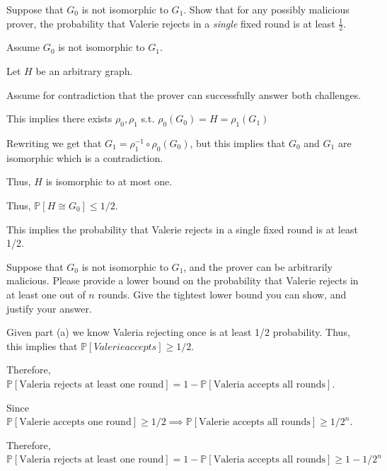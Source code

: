 \documentclass[12pt, letterpaper]{article}
\renewcommand{\P}{\mathbb{P}}
\renewcommand{\t}[1]{\text{#1}}
\begin{document}
\begin{subproblem}{}
    Suppose that $G_0$ is not isomorphic to $G_1$. 
Show that for any possibly malicious prover, the probability 
that 
Valerie rejects in a \emph{single} fixed round is at least $\frac12$. 
\end{subproblem}
\begin{problemproof}
    Assume $G_0$ is not isomorphic to $G_1$.

    Let $H$ be an arbitrary graph.

    Assume for contradiction that the prover can successfully answer both challenges.

    This implies there exists $\rho_0,\rho_1$ s.t. $\rho_0(G_0)=H=\rho_1(G_1)$

    Rewriting we get that $G_1 = \rho_1^{-1} \circ \rho_0(G_0)$, but this implies that $G_0$ and $G_1$ are isomorphic which is a contradiction.

    Thus, $H$ is isomorphic to at most one. 
    
    Thus, $\P[H \cong G_0] \leq 1/2$.

    This implies the probability that Valerie rejects in a single fixed round is at least 1/2.
\end{problemproof}

\begin{subproblem}{}
    Suppose that $G_0$ is not isomorphic to $G_1$, and the prover 
can be arbitrarily malicious.
Please provide a lower bound on the probability that Valerie rejects in at least
one out of $n$ rounds. Give the tightest 
lower bound you can show, and justify your answer.
\end{subproblem}
\begin{problemproof}
    Given part (a) we know Valeria rejecting once is at least 1/2 probability. Thus, this implies that $\P[Valerie accepts] \geq 1/2$.

    Therefore, $\P[\t{Valeria rejects at least one round}] = 1 - \P[\t{Valeria accepts all rounds}]$.

    Since $\P[\t{Valerie accepts one round}] \geq 1/2 \implies \P[\t{Valerie accepts all rounds}] \geq 1/2^n$.

    Therefore, $\P[\t{Valeria rejects at least one round}] = 1 - \P[\t{Valeria accepts all rounds}] \geq 1-1/2^{n}$
\end{problemproof}
\end{document}

